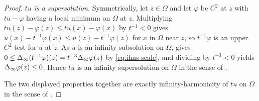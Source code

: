 \begin{proof}
\emph{$tu$ is a supersolution.} Symmetrically, let $z\in\Omega$ and let
$\varphi$ be $C^2$ at $z$ with $tu-\varphi$ having a local minimum on $\Omega$
at $z$. Multiplying $tu(z)-\varphi(z)\le tu(x)-\varphi(x)$ by $t^{-1}<0$ gives
$u(x)-t^{-1}\varphi(x)\le u(z)-t^{-1}\varphi(z)$ for $x$ in $\Omega$ near $z$,
so $t^{-1}\varphi$ is an upper $C^2$ test for $u$ at $z$. As $u$ is an infinity
subsolution on $\Omega$,  gives
$0\le\Delta_{\infty}(t^{-1}\varphi)(z)=t^{-3}\Delta_{\infty}\varphi(z)$ by
\eqref{eq:ihns-scale}, and dividing by $t^{-3}<0$ yields
$\Delta_{\infty}\varphi(z)\le0$. Hence $tu$ is an infinity supersolution on $\Omega$ in
the sense of .

The two displayed properties together are exactly infinity-harmonicity of $tu$
on $\Omega$ in the sense of .
\end{proof}

